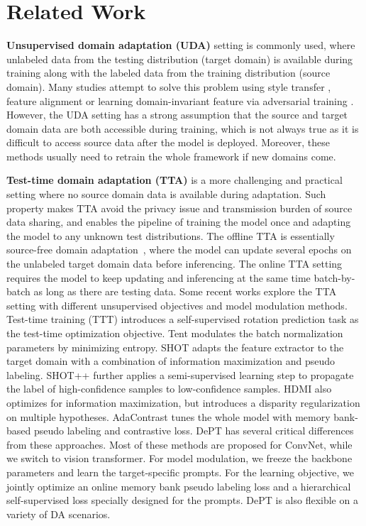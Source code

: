 \documentclass{article} \usepackage{iclr2023_conference,times}
\begin{document}
\section{Related Work}



\textbf{Unsupervised domain adaptation (UDA)} setting is commonly used, where unlabeled data from the testing distribution (target domain) is available during training along with the labeled data from the training distribution (source domain). Many studies attempt to solve this problem using style transfer \citep{hoffman2018cycada,tang2021crossnorm,taigman2016unsupervised}, feature alignment \citep{long2015learning,sun2017correlation,peng2019moment} or learning domain-invariant feature via adversarial training \citep{ganin2016domain,tzeng2017adversarial}. However, the UDA setting has a strong assumption that the source and target domain data are both accessible during training, which is not always true as it is difficult to access source data after the model is deployed. Moreover, these methods usually need to retrain the whole framework if new domains come.

\textbf{Test-time domain adaptation (TTA)} is a more challenging and practical setting where no source domain data is available during adaptation. Such property makes TTA avoid the privacy issue and transmission burden of source data sharing, and enables the pipeline of training the model once and adapting the model to any unknown test distributions. The offline TTA is essentially source-free domain adaptation~\citep{kundu2020universal,liang2020we}, where the model can update several epochs on the unlabeled target domain data before inferencing. The online TTA setting requires the model to keep updating and inferencing at the same time batch-by-batch as long as there are testing data. Some recent works explore the TTA setting with different unsupervised objectives and model modulation methods. Test-time training (TTT) \citep{sun2019test} introduces a self-supervised rotation prediction task as the test-time optimization objective. Tent \citep{wang2020tent} modulates the batch normalization parameters by minimizing entropy. SHOT \citep{liang2020we} adapts the feature extractor to the target domain with a combination of information maximization and pseudo labeling. SHOT++ \citep{liang2021source} further applies a semi-supervised learning step to propagate the label of high-confidence samples to low-confidence samples. HDMI \citep{lao2021hypothesis} also optimizes for information maximization, but introduces a disparity regularization on multiple hypotheses. AdaContrast \citep{chen2022contrastive} tunes the whole model with memory bank-based pseudo labeling and contrastive loss. DePT has several critical differences from these approaches. Most of these methods are proposed for ConvNet, while we switch to vision transformer. For model modulation, we freeze the backbone parameters and learn the target-specific prompts. For the learning objective, we jointly optimize an online memory bank pseudo labeling loss and a hierarchical self-supervised loss specially designed for the prompts. DePT is also flexible on a variety of DA scenarios.
\end{document}
